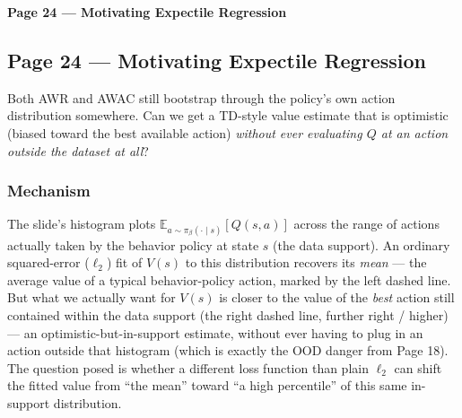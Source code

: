 \bigskip

\textbf{Page 24 --- Motivating Expectile Regression}

\subsection*{Page 24 --- Motivating Expectile Regression}

Both AWR and AWAC still bootstrap through the policy's own action distribution somewhere. Can we get a TD-style value estimate that is optimistic (biased toward the best available action) \emph{without ever evaluating $Q$ at an action outside the dataset at all}?

\subsubsection*{Mechanism}

The slide's histogram plots $\mathbb{E}_{a\sim\pi_\beta(\cdot\mid s)}[Q(s,a)]$ across the range of actions actually taken by the behavior policy at state $s$ (the data support). An ordinary squared-error ($\ell_2$) fit of $V(s)$ to this distribution recovers its \emph{mean} --- the average value of a typical behavior-policy action, marked by the left dashed line. But what we actually want for $V(s)$ is closer to the value of the \emph{best} action still contained within the data support (the right dashed line, further right / higher) --- an optimistic-but-in-support estimate, without ever having to plug in an action outside that histogram (which is exactly the OOD danger from Page 18). The question posed is whether a different loss function than plain $\ell_2$ can shift the fitted value from ``the mean'' toward ``a high percentile'' of this same in-support distribution.
